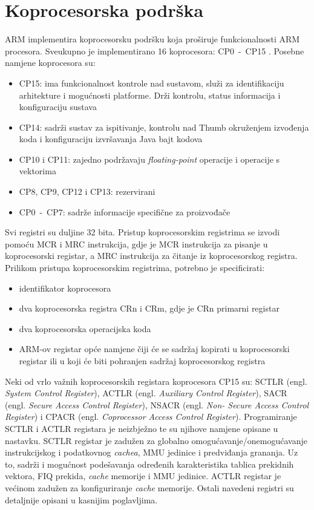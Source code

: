 \documentclass[times, utf8, diplomski, numeric]{fer}
\begin{document}
\section{Koprocesorska podrška}
ARM implementira koprocesorsku podršku koja proširuje funkcionalnosti ARM procesora. Sveukupno je implementirano 16 koprocesora:
CP0~-~CP15 \cite{arch_man}. Posebne namjene koprocesora su:
\begin{itemize}
  \item{CP15: ima funkcionalnost kontrole nad sustavom, služi za identifikaciju arhitekture i mogućnosti platforme. Drži
  kontrolu, status informacija i konfiguraciju sustava}
  \item{CP14: sadrži sustav za ispitivanje, kontrolu nad Thumb okruženjem izvođenja koda i konfiguraciju izvršavanja Java
  bajt kodova}
  \item{CP10 i CP11: zajedno podržavaju \textit{floating-point} operacije i operacije s vektorima}
  \item{CP8, CP9, CP12 i CP13: rezervirani}
  \item{CP0~-~CP7: sadrže informacije specifične za proizvođače}
\end{itemize}
Svi registri su duljine 32 bita. Pristup koprocesorskim registrima se izvodi pomoću MCR i MRC instrukcija, gdje je MCR
instrukcija za pisanje u koprocesorski registar, a MRC instrukcija za čitanje iz koprocesorskog registra.
Prilikom pristupa koprocesorskim registrima, potrebno je specificirati:
\begin{itemize}
  \item{identifikator koprocesora}
  \item{dva koprocesorska registra CRn i CRm, gdje je CRn primarni registar}
  \item{dva koprocesorska operacijska koda}
  \item{ARM-ov registar opće namjene čiji će se sadržaj kopirati u koprocesorski registar ili u koji će biti pohranjen
  sadržaj koprocesorskog registra}
\end{itemize}
Neki od vrlo važnih koprocesorskih registara koprocesora CP15 su: SCTLR (engl. \textit{System Control Register}), ACTLR
(engl. \textit{Auxiliary Control Register}), SACR (engl. \textit{Secure Access Control Register}), NSACR (engl. \textit{Non-
Secure Access Control Register}) i CPACR (engl. \textit{Coprocessor Access Control Register}). Programiranje SCTLR i ACTLR
registara je neizbježno te su njihove namjene opisane u nastavku. SCTLR registar je zadužen za globalno
omogućavanje/onemogućavanje instrukcijskog i podatkovnog \textit{cachea}, MMU jedinice i predviđanja grananja. Uz to, sadrži
i mogućnost podešavanja određenih karakteristika tablica prekidnih vektora, FIQ prekida, \textit{cache} memorije i MMU jedinice.
ACTLR registar je većinom zadužen za konfiguriranje \textit{cache} memorije. Ostali navedeni registri su detaljnije opisani u
kasnijim poglavljima.
\end{document}
